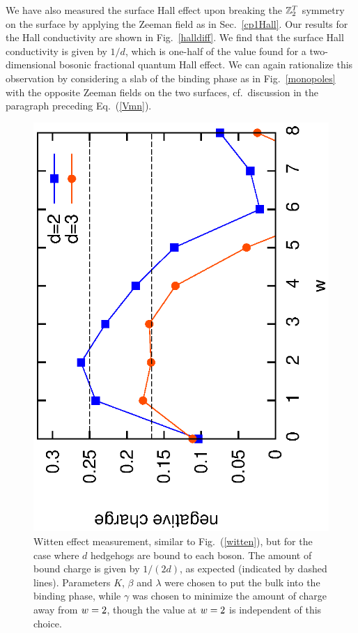 We have also measured the surface Hall effect upon breaking the $\ztwot$ symmetry on the surface by applying the Zeeman field as in Sec.~\ref{cp1Hall}.
Our results for the Hall conductivity are shown in Fig.~\ref{halldiff}. We find that the surface Hall conductivity is given by $1/d$, which is one-half of the value found for a two-dimensional bosonic fractional quantum Hall effect.\cite{FQHE}  We can again rationalize this observation by considering a slab of the binding phase as in Fig.~\ref{monopoles} with the opposite Zeeman fields on the two surfaces, cf.\ discussion in the paragraph preceding Eq.~(\ref{Vmn}).

\begin{figure}
\includegraphics[width=0.75\linewidth,angle=-90]{figures/wittend.eps}
\caption{Witten effect measurement, similar to Fig.~(\ref{witten}), but for the case where $d$ hedgehogs are bound to each boson. The amount of bound charge is given by $1/(2d)$, as expected (indicated by dashed lines). Parameters $K$, $\beta$ and $\lambda$ were chosen to put the bulk into the binding phase, while $\gamma$ was chosen to minimize the amount of charge away from $\scripty{r}=2$, though the value at $\scripty{r}=2$ is independent of this choice.
}
\label{wittend}
\end{figure}

